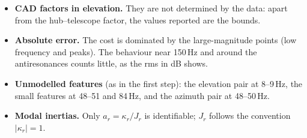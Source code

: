 \documentclass[10pt,a4paper]{article}
\numberwithin{equation}{section}
\begin{document}
\begin{itemize}
\item \textbf{CAD factors in elevation.} They are not determined by the data: apart from the hub--telescope factor, the values reported are the bounds.
\item \textbf{Absolute error.} The cost is dominated by the large-magnitude points (low frequency and peaks). The behaviour near 150\,Hz and around the antiresonances counts little, as the rms in dB shows.
\item \textbf{Unmodelled features} (as in the first step): the elevation pair at 8--9\,Hz, the small features at 48--51 and 84\,Hz, and the azimuth pair at 48--50\,Hz.
\item \textbf{Modal inertias.} Only $a_r=\kappa_r/J_r$ is identifiable; $J_r$ follows the convention $|\kappa_r|=1$.
\end{itemize}
\end{document}
